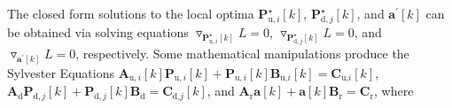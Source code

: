 \documentclass[9pt,journal]{IEEEtran}
\newcommand{\bracket}[1]{{\left [{#1}\right ]}}
\newcommand{\PiB}{\mathbf{P}_{\textrm{u},i}\bracket{k}}
\newcommand{\PBj}{\mathbf{P}_{\textrm{d},j}\bracket{k}}
\begin{document}
The closed form solutions to the local optima $\mathbf{P}^\star_{\textrm{u},i}\bracket{k}$, $\mathbf{P}^\star_{\textrm{d},j}\bracket{k}$, and $\mathbf{a}^\prime\bracket{k}$ can be obtained via solving equations $\triangledown_{\mathbf{P}^\star_{\textrm{u},i}\bracket{k}}L=0$, $\triangledown_{\mathbf{P}^\star_{\textrm{d},j}\bracket{k}}L=0$, and $\triangledown_{\mathbf{a}^\prime\bracket{k}}L=0$, respectively.
Some mathematical manipulations produce the Sylvester Equations $\mathbf{A}_{\textrm{u},i}\bracket{k}\PiB+\PiB\mathbf{B}_{\textrm{u,}i}\bracket{k}=\mathbf{C}_{\textrm{u,}i}\bracket{k}$, $\mathbf{A}_{\textrm{d}}\PBj+\PBj\mathbf{B}_{\textrm{d}}=\mathbf{C}_{\textrm{d,}j}\bracket{k}$, and $\mathbf{A}_{\textrm{r}}\mathbf{a}\bracket{k}+\mathbf{a}\bracket{k}\mathbf{B}_{\textrm{r}}=\mathbf{C}_{\textrm{r}}$, where \par\indent\small
\end{document}
